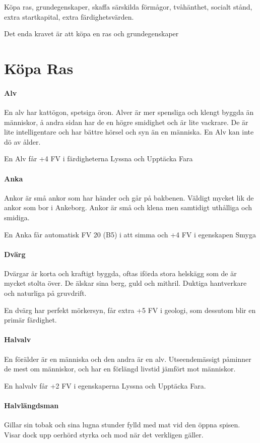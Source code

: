 \documentclass[a4paper, 10pt, titlepage]{article}
\begin{document}
Köpa ras, grundegenskaper, skaffa särskilda förmågor, tvåhänthet, socialt stånd, extra startkapital,
extra färdighetsvärden.

Det enda kravet är att köpa en ras och grundegenskaper

\section{Köpa Ras}
\paragraph{Alv} En alv har kattögon, spetsiga öron. Alver är mer spensliga och klengt byggda än människor,
å andra sidan har de en högre smidighet och är lite vackrare. De är lite intelligentare och har bättre
hörsel och syn än en människa. En Alv kan inte dö av ålder.

En Alv får +4 FV i färdigheterna Lyssna och Upptäcka Fara

\paragraph{Anka} Ankor är små ankor som har händer och går på bakbenen. Väldigt mycket lik de ankor som bor i Ankeborg.
Ankor är små och klena men samtidigt uthålliga och smidiga.

En Anka får automatisk FV 20 (B5) i att simma och +4 FV i egenskapen Smyga

\paragraph{Dvärg} Dvärgar är korta och kraftigt byggda, oftas iförda stora helskägg som de är mycket stolta över.
De älskar sina berg, guld och mithril. Duktiga hantverkare och naturliga på gruvdrift.

En dvärg har perfekt mörkersyn, får extra +5 FV i geologi, som dessutom blir en primär färdighet.

\paragraph{Halvalv} En förälder är en människa och den andra är en alv. Utseendemässigt påminner de mest
om människor, och har en förlängd livstid jämfört mot människor.

En halvalv får +2 FV i egenskaperna Lyssna och Upptäcka Fara.

\paragraph{Halvlängdsman} Gillar sin tobak och sina lugna stunder fylld med mat vid den öppna spisen.
Visar dock upp oerhörd styrka och mod när det verkligen gäller.
\end{document}
